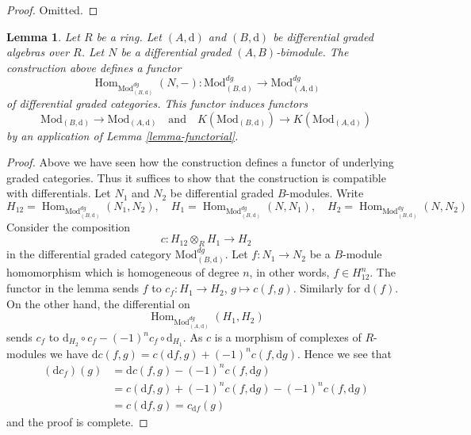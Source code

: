 \documentclass{stacks-project}
\theoremstyle{plain}
\newtheorem{lemma}[subsection]{Lemma}
\theoremstyle{definition}
\theoremstyle{remark}
\numberwithin{equation}{subsection}
\def\Hom{\mathop{\mathrm{Hom}}\nolimits}
\begin{document}
\begin{proof}
Omitted.
\end{proof}

\begin{lemma}
\label{lemma-hom}
Let $R$ be a ring. Let $(A, \text{d})$ and $(B, \text{d})$
be differential graded algebras over $R$. Let $N$ be a
differential graded $(A, B)$-bimodule. The construction above
defines a functor
$$
\Hom_{\text{Mod}^{dg}_{(B, \text{d})}}(N, -) :
\text{Mod}^{dg}_{(B, \text{d})}
\longrightarrow
\text{Mod}^{dg}_{(A, \text{d})}
$$
of differential graded categories. This functor induces functors
$$
\text{Mod}_{(B, \text{d})} \to \text{Mod}_{(A, \text{d})}
\quad\text{and}\quad
K(\text{Mod}_{(B, \text{d})}) \to K(\text{Mod}_{(A, \text{d})})
$$
by an application of Lemma \ref{lemma-functorial}.
\end{lemma}

\begin{proof}
Above we have seen how the construction defines a functor of underlying
graded categories. Thus it suffices to show that the construction is
compatible with differentials. Let $N_1$ and $N_2$ be differential
graded $B$-modules. Write
$$
H_{12} = \Hom_{\text{Mod}^{dg}_{(B, \text{d})}}(N_1, N_2),\quad
H_1 = \Hom_{\text{Mod}^{dg}_{(B, \text{d})}}(N, N_1),\quad
H_2 = \Hom_{\text{Mod}^{dg}_{(B, \text{d})}}(N, N_2)
$$
Consider the composition
$$
c : H_{12} \otimes_R H_1 \longrightarrow H_2
$$
in the differential graded category $\text{Mod}^{dg}_{(B, \text{d})}$.
Let $f : N_1 \to N_2$ be a $B$-module homomorphism which is homogeneous
of degree $n$, in other words, $f \in H_{12}^n$.
The functor in the lemma sends $f$ to $c_f : H_1 \to H_2$, $g \mapsto c(f, g)$.
Similarly for $\text{d}(f)$. On the other hand, the differential on
$$
\Hom_{\text{Mod}^{dg}_{(A, \text{d})}}(H_1, H_2)
$$
sends $c_f$ to $\text{d}_{H_2} \circ c_f - (-1)^n c_f \circ \text{d}_{H_1}$.
As $c$ is a morphism of complexes of $R$-modules we have
$\text{d} c(f, g) = c(\text{d}f, g) + (-1)^n c(f, \text{d}g)$.
Hence we see that
\begin{align*}
(\text{d}c_f)(g)
& =
\text{d}c(f,g) - (-1)^n c(f, \text{d}g) \\
& =
c(\text{d}f, g) + (-1)^n c(f, \text{d}g)  - (-1)^n c(f, \text{d}g) \\
& =
c(\text{d}f, g) = c_{\text{d}f}(g)
\end{align*}
and the proof is complete.
\end{proof}
\end{document}
